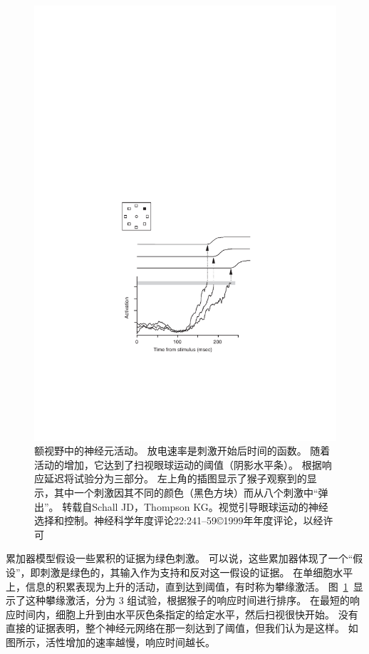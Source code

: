 \begin{figure}[!htb]
	\centering
	\includegraphics{chap3/3_4}
	\caption{额视野中的神经元活动。
		放电速率是刺激开始后时间的函数。
		随着活动的增加，它达到了扫视眼球运动的阈值（阴影水平条）。
		根据响应延迟将试验分为三部分。
		左上角的插图显示了猴子观察到的显示，其中一个刺激因其不同的颜色（黑色方块）而从八个刺激中“弹出”。
		转载自Schall JD，Thompson KG。视觉引导眼球运动的神经选择和控制。神经科学年度评论22:241–59©1999年年度评论，以经许可}
	\label{fig:3_4}
\end{figure}


累加器模型假设一些累积的证据为绿色刺激。
可以说，这些累加器体现了一个“假设”，即刺激是绿色的，其输入作为支持和反对这一假设的证据。
在单细胞水平上，信息的积累表现为上升的活动，直到达到阈值，有时称为攀缘激活。
图~\ref{fig:3_4}~显示了这种攀缘激活，分为 3 组试验，根据猴子的响应时间进行排序。
在最短的响应时间内，细胞上升到由水平灰色条指定的给定水平，然后扫视很快开始。
没有直接的证据表明，整个神经元网络在那一刻达到了阈值，但我们认为是这样。
如图所示，活性增加的速率越慢，响应时间越长。\par


